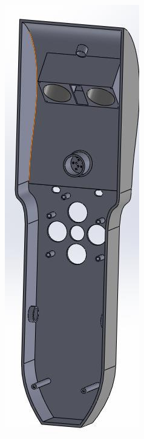 \begin{figure}[!htbp]
\begin{subfigure}[m]{.3\linewidth}
    \end{subfigure}
    \hfill
    \begin{subfigure}[m]{.3\linewidth}
        \includegraphics[width=\linewidth]{assets/conception1/img335.jpg}
    \end{subfigure}
\end{figure}

